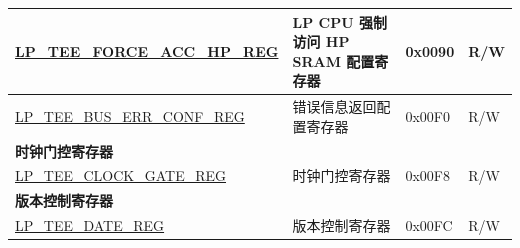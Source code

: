 \begin{longtable}{ | l | l | p{2.2cm} | p{1cm} | }
\hyperref[regdesc:LPTEEFORCEACCHPREG]{LP\_TEE\_FORCE\_ACC\_HP\_REG} & LP CPU 强制访问 HP SRAM 配置寄存器 & 0x0090 & R/W \\ \hline

\hyperref[regdesc:LPTEEBUSERRCONFREG]{LP\_TEE\_BUS\_ERR\_CONF\_REG} & 错误信息返回配置寄存器 & 0x00F0 & R/W \\ \hline
\multicolumn{4}{|l|}{\textbf{时钟门控寄存器}} \\ \hline
\hyperref[regdesc:LPTEECLOCKGATEREG]{LP\_TEE\_CLOCK\_GATE\_REG} & 时钟门控寄存器 & 0x00F8 & R/W \\ \hline
\multicolumn{4}{|l|}{\textbf{版本控制寄存器}} \\ \hline
\hyperref[regdesc:LPTEEDATEREG]{LP\_TEE\_DATE\_REG} & 版本控制寄存器 & 0x00FC & R/W \\ \hline
\end{longtable}
